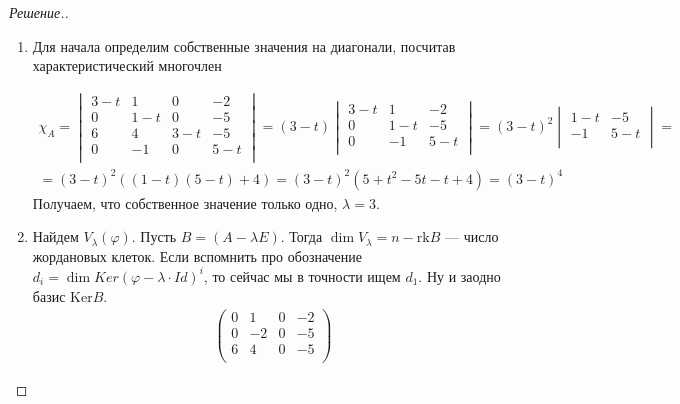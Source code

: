 \documentclass[a4paper]{article}
\theoremstyle{remark}
\begin{document}
        \begin{proof}[Решение.] \ 
            \begin{enumerate}
                \item Для начала определим собственные значения на диагонали, 
                посчитав характеристический многочлен

                \begin{multline*} 
                \chi_{A} = 
                 \begin{vmatrix}
                    3-t & 1 & 0 & -2 \\
                    0 & 1-t & 0 & -5\\
                    6 & 4 & 3-t & -5 \\
                    0 & -1 & 0 & 5-t \\
                 \end{vmatrix} = (3-t)
                 \begin{vmatrix}
                    3-t & 1 & -2 \\
                    0 & 1-t & -5\\
                    0 & -1  & 5-t \\
                 \end{vmatrix} =
                 (3 - t)^2
                 \begin{vmatrix}
                    1-t & -5\\
                    -1  & 5-t \\
                 \end{vmatrix} = \\ =
                 (3 - t)^2 ((1 - t)(5-t) + 4) = (3 - t)^2 (5 + t^2 -5t - t + 4) = (3 - t)^4
                \end{multline*}
                Получаем, что собственное значение только одно, $\lambda = 3$. 
                \item Найдем $V_\lambda(\varphi)$. Пусть $B = (A - \lambda E)$. Тогда $\dim V_\lambda = n - \text{rk}B$ 
                --- число жордановых клеток. Если вспомнить про обозначение $d_i = \dim Ker(\varphi - \lambda \cdot Id)^i$, 
                то сейчас мы в точности ищем $d_1$. Ну и заодно базис $\text{Ker} B$.
                \begin{multline*}
                    \begin{pmatrix}
                        0 & 1 & 0 & -2 \\
                        0 & -2 & 0 & -5\\
                        6 & 4 & 0 & -5 \\

\end{pmatrix}
\end{multline*}
\end{enumerate}
\end{proof}
\end{document}
